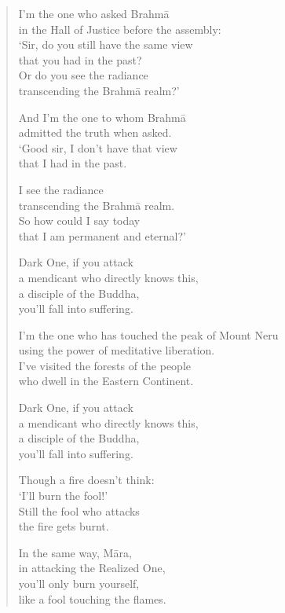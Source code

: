 \documentclass[12pt,openany]{book}%
\begin{document}
\begin{verse}
I’m the one who asked \textsanskrit{Brahmā} \\
in the Hall of Justice before the assembly: \\
‘Sir, do you still have the same view \\
that you had in the past? \\
Or do you see the radiance \\
transcending the \textsanskrit{Brahmā} realm?’ 

And I’m the one to whom \textsanskrit{Brahmā} \\
admitted the truth when asked. \\
‘Good sir, I don’t have that view \\
that I had in the past. 

I see the radiance \\
transcending the \textsanskrit{Brahmā} realm. \\
So how could I say today \\
that I am permanent and eternal?’ 

Dark One, if you attack \\
a mendicant who directly knows this, \\
a disciple of the Buddha, \\
you’ll fall into suffering. 

I’m the one who has touched the peak of Mount Neru \\
using the power of meditative liberation. \\
I’ve visited the forests of the people \\
who dwell in the Eastern Continent. 

Dark One, if you attack \\
a mendicant who directly knows this, \\
a disciple of the Buddha, \\
you’ll fall into suffering. 

Though a fire doesn’t think: \\
‘I’ll burn the fool!’ \\
Still the fool who attacks \\
the fire gets burnt. 

In the same way, \textsanskrit{Māra}, \\
in attacking the Realized One, \\
you’ll only burn yourself, \\
like a fool touching the flames. 


\end{verse}
\end{document}
